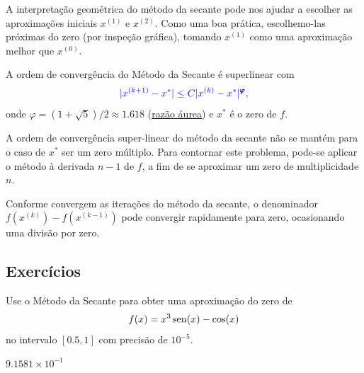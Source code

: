 \begin{obs}
  A interpretação geométrica do método da secante pode nos ajudar a escolher as aproximações iniciais $x^{(1)}$ e $x^{(2)}$. Como uma boa prática, escolhemo-las próximas do zero (por inspeção gráfica), tomando $x^{(1)}$ como uma aproximação melhor que $x^{(0)}$. 
\end{obs}

\begin{obs}
  A ordem de convergência do Método da Secante é superlinear com
  \begin{equation}\color{blue}|x^{(k+1)}-x^*| \leq C|x^{(k)}-x^*|^{\pmb{\varphi}},
  \end{equation}
  onde $\varphi = (1+\sqrt{5})/2\approx 1.618$ (\href{https://pt.wikipedia.org/wiki/Propor%C3%A7%C3%A3o_%C3%A1urea}{razão áurea}) e $x^*$ é o zero de $f$.
\end{obs}

\begin{obs}
  A ordem de convergência super-linear do método da secante não se mantém para o caso de $x^*$ ser um zero múltiplo. Para contornar este problema, pode-se aplicar o método à derivada $n-1$ de $f$, a fim de se aproximar um zero de multiplicidade $n$.
\end{obs}

\begin{obs}
  Conforme convergem as iterações do método da secante, o denominador $f(x^{(k)})-f(x^{(k-1)})$ pode convergir rapidamente para zero, ocasionando uma divisão por zero.
\end{obs}


\subsection*{Exercícios}

\begin{exer}
  Use o Método da Secante para obter uma aproximação do zero de
  \begin{equation}
    f(x)=x^3\operatorname{sen}(x)-\cos(x)
  \end{equation}
  no intervalo $[0.5, 1]$ com precisão de $10^{-5}$.
\end{exer}
\begin{resp}
  $9.1581\times 10^{-1}$
\end{resp}

